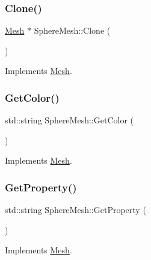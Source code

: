 \subsubsection{\texorpdfstring{Clone()}{Clone()}}
{\footnotesize\ttfamily \mbox{\hyperlink{class_mesh}{Mesh}} $\ast$ Sphere\+Mesh\+::\+Clone (\begin{DoxyParamCaption}{ }\end{DoxyParamCaption})\hspace{0.3cm}{\ttfamily [virtual]}}



Implements \mbox{\hyperlink{class_mesh_a11928acab4066671d10e9e531ad96fb6}{Mesh}}.

\mbox{\label{class_sphere_mesh_a1c490b89552f51b7960dc760ac09edf8}} 
\subsubsection{\texorpdfstring{GetColor()}{GetColor()}}
{\footnotesize\ttfamily std\+::string Sphere\+Mesh\+::\+Get\+Color (\begin{DoxyParamCaption}{ }\end{DoxyParamCaption})\hspace{0.3cm}{\ttfamily [virtual]}}



Implements \mbox{\hyperlink{class_mesh_aa413c0ccbc081aa50a2946e1c6930b0c}{Mesh}}.

\mbox{\label{class_sphere_mesh_a803470d419de41ffd75d6b932a819a06}} 
\subsubsection{\texorpdfstring{GetProperty()}{GetProperty()}}
{\footnotesize\ttfamily std\+::string Sphere\+Mesh\+::\+Get\+Property (\begin{DoxyParamCaption}{ }\end{DoxyParamCaption})\hspace{0.3cm}{\ttfamily [virtual]}}



Implements \mbox{\hyperlink{class_mesh_a94464260c2d9ad3c274f72b472fc9a2f}{Mesh}}.

